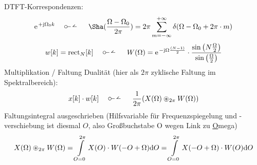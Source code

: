 \begin{Werkzeug}
DTFT-Korrespondenzen:
\begin{align}
\e^{+\im\Omega_0 k} \quad\dtft\quad \Sha(\frac{\Omega-\Omega_0}{2\pi})
= 2\pi \sum\limits_{m=-\infty}^{+\infty}
\delta(\Omega-\Omega_0 + 2\pi\cdot m)
\end{align}
%
\begin{equation}
w[k] = \mathrm{rect}_N[k]
\quad\dtft\quad
W(\Omega)=\e^{-\im\Omega\frac{(N-1)}{2}}\cdot\frac{\sin\left(N\frac{\Omega}{2}\right)}{\sin\left(\frac{\Omega}{2}\right)}
\end{equation}
%
Multiplikation / Faltung Dualität (hier als $2\pi$ zyklische Faltung im Spektralbereich):
\begin{align}
x[k] \cdot w[k] \quad\dtft\quad \frac{1}{2\pi} (X(\Omega) \circledast_{2\pi} W(\Omega))
\end{align}
%
Faltungsintegral ausgeschrieben (Hilfsvariable für Frequenzspiegelung und -verschiebung
ist diesmal $O$, also Großbuchstabe O wegen Link zu \underline{O}mega)
\begin{align}
X(\Omega) \circledast_{2\pi} W(\Omega) =
\int\limits_{O=0}^{2\pi} X(O) \cdot W(-O + \Omega) \mathrm{d} O =
\int\limits_{O=0}^{2\pi} X(-O+\Omega) \cdot W(O) \mathrm{d} O
\end{align}
\end{Werkzeug}
